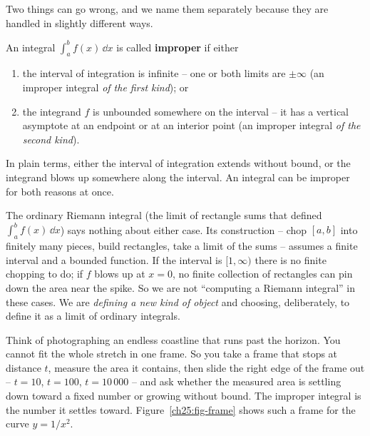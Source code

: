 Two things can go wrong, and we name them separately because they are handled
in slightly different ways.

\begin{definition}
\label{ch25:def-improper}
An integral $\int_a^b f(x)\,\dd x$ is called \textbf{improper} if either
\begin{enumerate}
  \item the interval of integration is infinite -- one or both limits are
  $\pm\infty$ (an improper integral \emph{of the first kind}); or
  \item the integrand $f$ is unbounded somewhere on the interval -- it has a
  vertical asymptote at an endpoint or at an interior point (an improper integral
  \emph{of the second kind}).
\end{enumerate}
In plain terms, either the interval of integration extends without bound, or the
integrand blows up somewhere along the interval.
An integral can be improper for both reasons at once.
\end{definition}

The ordinary Riemann integral (the limit of rectangle sums that
defined $\int_a^b f(x)\,\dd x$) says nothing about either case. Its
construction -- chop $[a,b]$ into finitely many pieces, build rectangles,
take a limit of the sums -- assumes a finite interval and a bounded function. If
the interval is $[1,\infty)$ there is no finite chopping to do; if $f$ blows up at
$x=0$, no finite collection of rectangles can pin down the area near the spike.
So we are not ``computing a Riemann integral'' in these cases. We are
\emph{defining a new kind of object} and choosing, deliberately, to define it as a
limit of ordinary integrals.

\begin{intuitionbox}
Think of photographing an endless coastline that runs past the horizon. You cannot fit the whole stretch in one frame. So you take a frame that
stops at distance $t$, measure the area it contains, then slide the right edge of
the frame out -- $t = 10$, $t = 100$, $t = 10\,000$ -- and ask whether the measured
area is settling down toward a fixed number or growing without bound. The improper
integral is the number it settles toward. Figure~\ref{ch25:fig-frame} shows such a
frame for the curve $y=1/x^2$.
\end{intuitionbox}

